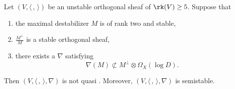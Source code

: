 \begin{prop}\label{irregular}
Let $(V, \langle \,, \, \rangle)$ be an unstable orthogonal sheaf of $\rk(V)\geq 5$. Suppose that
\begin{enumerate}
\item the maximal destabilizer $M$ is of rank two and stable,
\item $\frac{M^\perp}{M}$ is a stable orthogonal sheaf,
\item there exists a \lconnection $\nabla$ satisfying\vspace*{-3pt}
\[
\nabla(M)\not \subset M^\perp\otimes\Omega_X(\log D).
\]
\end{enumerate}
Then $(V,\langle \,, \, \rangle,\nabla)$ is not quasi \grsemistable. Moreover, $(V, \langle \,, \, \rangle, \nabla)$ is semistable.
\end{prop}

